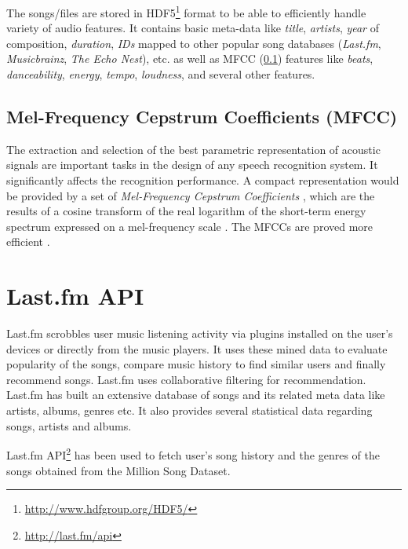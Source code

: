 		The songs/files are stored in HDF5\footnote{\url{http://www.hdfgroup.org/HDF5/}} format to be able to efficiently handle variety of audio features. It contains basic meta-data like \emph{title}, \emph{artists}, \emph{year} of composition, \emph{duration}, \emph{IDs} mapped to other popular song databases (\emph{Last.fm}, \emph{Musicbrainz}, \emph{The Echo Nest}), etc. as well as MFCC (\ref{subsec:mfcc}) features like \emph{beats}, \emph{danceability}, \emph{energy}, \emph{tempo}, \emph{loudness}, and several other features.
		
		\subsection{Mel-Frequency Cepstrum Coefficients (MFCC)}
		\label{subsec:mfcc}
			The extraction and selection of the best parametric representation of acoustic signals are important tasks in the design of any speech recognition system. It significantly affects the recognition performance. A compact representation would be provided by a set of \emph{Mel-Frequency Cepstrum Coefficients} \cite{zheng2001comparison}, which are the results of a cosine transform of the real logarithm of the short-term energy spectrum expressed on a mel-frequency scale \cite{pols1966spectral}. The MFCCs are proved more efficient \cite{davis1980comparison}.

	\section{Last.fm API}
	\label{sec:lastfm_api}
		Last.fm scrobbles user music listening activity via plugins installed on the user's devices or directly from the music players. It uses these mined data to evaluate popularity of the songs, compare music history to find similar users and finally recommend songs. Last.fm uses collaborative filtering for recommendation. Last.fm has built an extensive database of songs and its related meta data like artists, albums, genres etc. It also provides several statistical data regarding songs, artists and albums.
		
		Last.fm API\footnote{\url{http://last.fm/api}} has been used to fetch user's song history and the genres of the songs obtained from the Million Song Dataset.